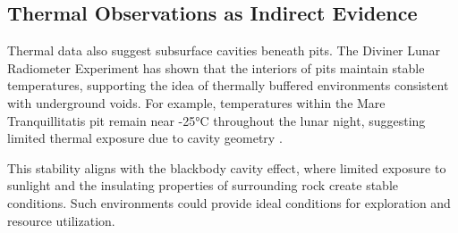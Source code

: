 \subsection{Thermal Observations as Indirect Evidence}

Thermal data also suggest subsurface cavities beneath pits. The Diviner Lunar Radiometer Experiment has shown that the interiors of pits maintain stable temperatures, supporting the idea of thermally buffered environments consistent with underground voids. For example, temperatures within the Mare Tranquillitatis pit remain near -25°C throughout the lunar night, suggesting limited thermal exposure due to cavity geometry \cite{thermal-lunar-pits, newer-thermal}.

This stability aligns with the blackbody cavity effect, where limited exposure to sunlight and the insulating properties of surrounding rock create stable conditions. Such environments could provide ideal conditions for exploration and resource utilization.